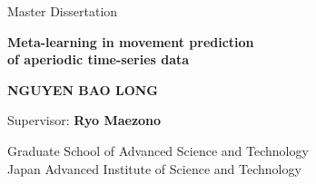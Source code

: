 \begin{titlepage}

\begin{center}

{
    \vfill
    \large Master Dissertation\\[3cm]
}

{
    \LARGE \bfseries Meta-learning in movement prediction\\of aperiodic time-series data\\[3cm]
}

{
    \large \bfseries NGUYEN BAO LONG\\[2cm]
}

\vfill

{
    Supervisor: \textbf{Ryo Maezono}\\[2cm]
}

Graduate School of Advanced Science and Technology\\
Japan Advanced Institute of Science and Technology




\end{center}


    
    
    
    
    
    
    
    
    
\end{titlepage}